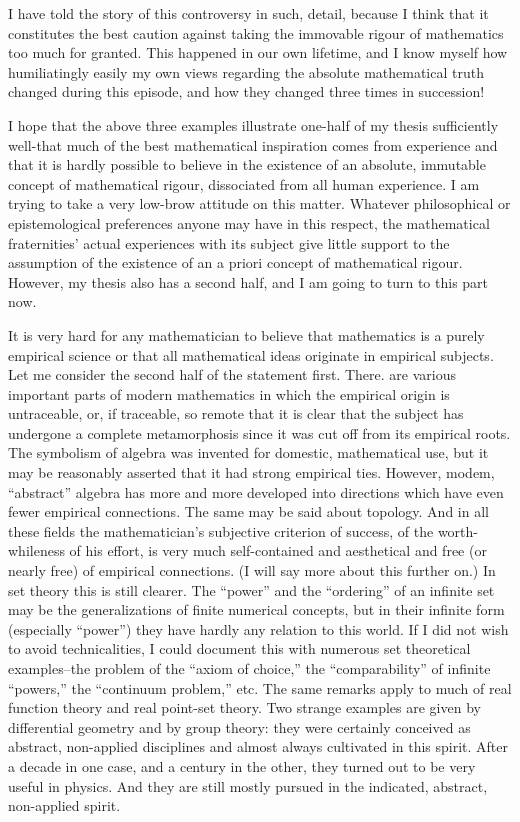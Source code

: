 \documentclass{article}
\begin{document}
I have told the story of this controversy in such, detail, because I think that it constitutes the best caution against taking the immovable rigour of mathematics too much for granted. This happened in our own lifetime, and I know myself how humiliatingly easily my own views regarding the absolute mathematical truth changed during this episode, and how they changed three times in succession!

I hope that the above three examples illustrate one-half of my thesis sufficiently well-that much of the best mathematical inspiration comes from experience and that it is hardly possible to believe in the existence of an absolute, immutable concept of mathematical rigour, dissociated from all human experience. I am trying to take a very low-brow attitude on this matter. Whatever philosophical or epistemological preferences anyone may have in this respect, the mathematical fraternities' actual experiences with its subject give little support to the assumption of the existence of an a priori concept of mathematical rigour. However, my thesis also has a second half, and I am going to turn to this part now.

It is very hard for any mathematician to believe that mathematics is a purely empirical science or that all mathematical ideas originate in empirical subjects. Let me consider the second half of the statement first. There. are various important parts of modern mathematics in which the empirical origin is untraceable, or, if traceable, so remote that it is clear that the subject has undergone a complete metamorphosis since it was cut off from its empirical roots. The symbolism of algebra was invented for domestic, mathematical use, but it may be reasonably asserted that it had strong empirical ties. However, modem, ``abstract'' algebra has more and more developed into directions which have even fewer empirical connections. The same may be said about topology. And in all these fields the mathematician's subjective criterion of success, of the worth-whileness of his effort, is very much self-contained and aesthetical and free (or nearly free) of empirical connections. (I will say more about this further on.) In set theory this is still clearer. The ``power'' and the ``ordering'' of an infinite set may be the generalizations of finite numerical concepts, but in their infinite form (especially ``power'') they have hardly any relation to this world. If I did not wish to avoid technicalities, I could document this with numerous set theoretical examples--the problem of the ``axiom of choice,'' the ``comparability'' of infinite ``powers,'' the ``continuum problem,'' etc. The same remarks apply to much of real function theory and real point-set theory. Two strange examples are given by differential geometry and by group theory: they were certainly conceived as abstract, non-applied disciplines and almost always cultivated in this spirit. After a decade in one case, and a century in the other, they turned out to be very useful in physics. And they are still mostly pursued in the indicated, abstract, non-applied spirit.
\end{document}
